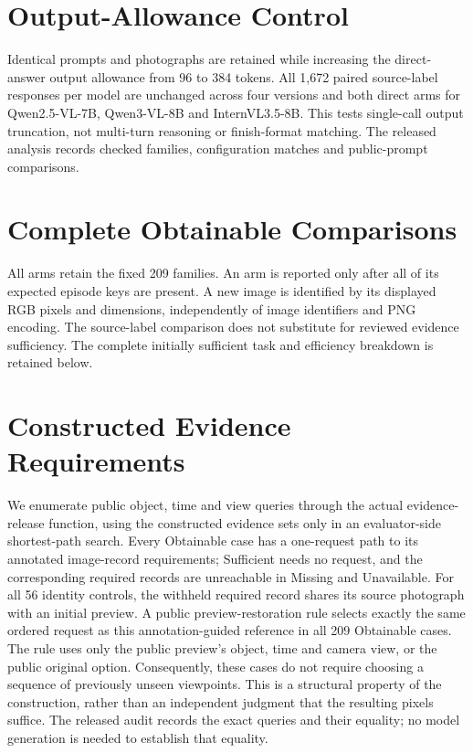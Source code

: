 \section{Output-Allowance Control}
Identical prompts and photographs are retained while increasing the direct-answer output allowance from 96 to 384 tokens.
All 1,672 paired source-label responses per model are unchanged across four versions and both direct arms for Qwen2.5-VL-7B, Qwen3-VL-8B and InternVL3.5-8B.
This tests single-call output truncation, not multi-turn reasoning or finish-format matching.
The released analysis records checked families, configuration matches and public-prompt comparisons.


\section{Complete Obtainable Comparisons}

All arms retain the fixed 209 families. An arm is reported only after all of its expected episode keys are present.
A new image is identified by its displayed RGB pixels and dimensions, independently of image identifiers and PNG encoding.
The source-label comparison does not substitute for reviewed evidence sufficiency.
The complete initially sufficient task and efficiency breakdown is retained below.


\section{Constructed Evidence Requirements}
We enumerate public object, time and view queries through the actual evidence-release function, using the constructed evidence sets only in an evaluator-side shortest-path search.
Every Obtainable case has a one-request path to its annotated image-record requirements; Sufficient needs no request, and the corresponding required records are unreachable in Missing and Unavailable.
For all 56 identity controls, the withheld required record shares its source photograph with an initial preview.
A public preview-restoration rule selects exactly the same ordered request as this annotation-guided reference in all 209 Obtainable cases.
The rule uses only the public preview's object, time and camera view, or the public original option.
Consequently, these cases do not require choosing a sequence of previously unseen viewpoints.
This is a structural property of the construction, rather than an independent judgment that the resulting pixels suffice.
The released audit records the exact queries and their equality; no model generation is needed to establish that equality.

